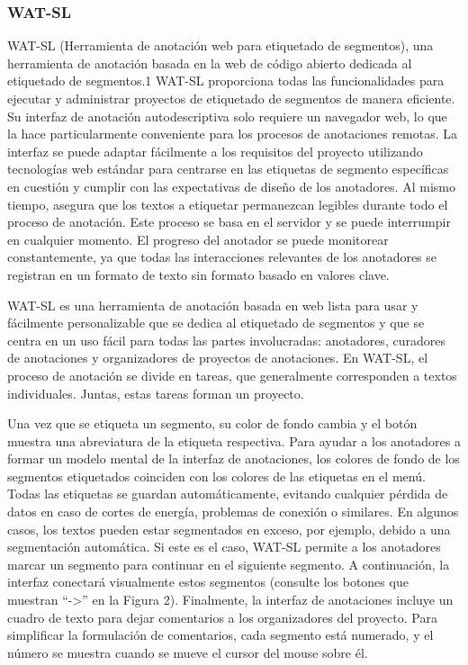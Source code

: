 \subsubsection*{WAT-SL}

WAT-SL (Herramienta de anotación web para etiquetado de segmentos), una herramienta de anotación basada en la web de código abierto dedicada al etiquetado de segmentos.1 WAT-SL proporciona todas las funcionalidades para ejecutar y administrar proyectos de etiquetado de segmentos de manera eficiente. Su interfaz de anotación autodescriptiva solo requiere un navegador web, lo que la hace particularmente conveniente para los procesos de anotaciones remotas. La interfaz se puede adaptar fácilmente a los requisitos del proyecto utilizando tecnologías web estándar para centrarse en las etiquetas de segmento específicas en cuestión y cumplir con las expectativas de diseño de los anotadores. Al mismo tiempo, asegura que los textos a etiquetar permanezcan legibles durante todo el proceso de anotación. Este proceso se basa en el servidor y se puede interrumpir en cualquier momento. El progreso del anotador se puede monitorear constantemente, ya que todas las interacciones relevantes de los anotadores se registran en un formato de texto sin formato basado en valores clave.

WAT-SL es una herramienta de anotación basada en web lista para usar y fácilmente personalizable que se dedica al etiquetado de segmentos y que se centra en un uso fácil para todas las partes involucradas: anotadores, curadores de anotaciones y organizadores de proyectos de anotaciones. En WAT-SL, el proceso de anotación se divide en tareas, que generalmente corresponden a textos individuales. Juntas, estas tareas forman un proyecto.

Una vez que se etiqueta un segmento, su color de fondo cambia y el botón muestra una abreviatura de la etiqueta respectiva. Para ayudar a los anotadores a formar un modelo mental de la interfaz de anotaciones, los colores de fondo de los segmentos etiquetados coinciden con los colores de las etiquetas en el menú. Todas las etiquetas se guardan automáticamente, evitando cualquier pérdida de datos en caso de cortes de energía, problemas de conexión o similares.
En algunos casos, los textos pueden estar segmentados en exceso, por ejemplo, debido a una segmentación automática. Si este es el caso, WAT-SL permite a los anotadores marcar un segmento para continuar en el siguiente segmento. A continuación, la interfaz conectará visualmente estos segmentos (consulte los botones que muestran “->” en la Figura 2). Finalmente, la interfaz de anotaciones incluye un cuadro de texto para dejar comentarios a los organizadores del proyecto. Para simplificar la formulación de comentarios, cada segmento está numerado, y el número se muestra cuando se mueve el cursor del mouse sobre él.

